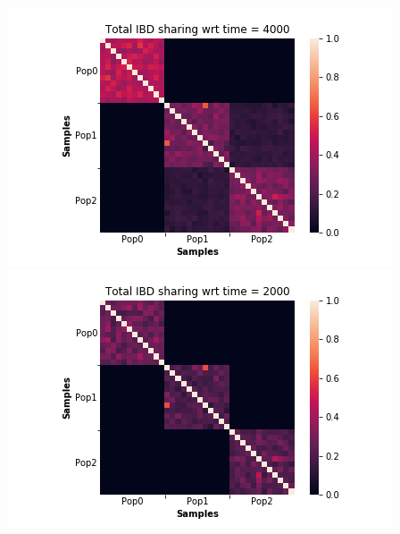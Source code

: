 \documentclass[25pt, a0paper, portrait, margin=0mm, innermargin=15mm,
     blockverticalspace=15mm, colspace=15mm, subcolspace=8mm]{tikzposter} %
\begin{document}
\begin{columns}
\begin{subcolumns}
{    \includegraphics[scale=.63]{pics/kinships-4000.png}
\includegraphics[scale=.63]{pics/kinships-2000.png}

  }
  \end{subcolumns}




\end{columns}
\end{document}
